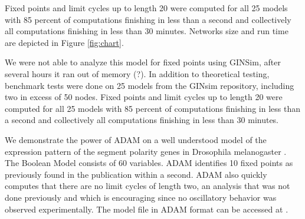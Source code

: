 \documentclass[11pt]{amsart}
\begin{document}
Fixed points and limit cycles up to length 20 were computed for all 25 models
with 85 percent of computations finishing in less than a second and
collectively all computations finishing in less than 30 minutes. Networks size
and run time are depicted in Figure \ref{fig:chart}.

We were not
able to analyze this model for fixed points using GINSim, after several hours
it ran out of memory (?).
In addition to theoretical testing, benchmark tests were done on 25 models from the GINsim repository, including two in excess of 50 nodes.  Fixed points and limit cycles up to length 20 were computed for all 25 models with 85 percent of computations finishing in less than a second and collectively all computations finishing in less than 30 minutes.

We demonstrate the power of ADAM on a well understood model of the
expression pattern of the segment polarity genes in Drosophila melanogaster
\cite{AO}. The Boolean Model consists of 60 variables. ADAM identifies 10
fixed points as previously found in the publication within a second. ADAM also
quickly computes that there are no limit cycles of length two, an analysis
that was not done previously and which is encouraging since no oscillatory
behavior was observed experimentally. The model file in ADAM format can be accessed at
\cite{??}.
\end{document}
